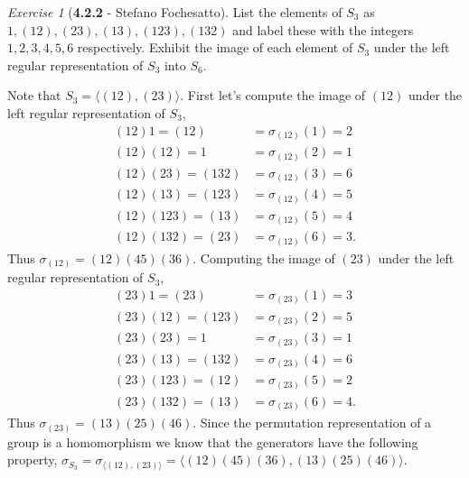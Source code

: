 \documentclass[12pt]{amsart}
\makeatletter
\theoremstyle{remark}
\newtheorem*{exercise}{Exercise}%
\renewenvironment{proof}[1][\proofname]{\par\doublespacing
  \pushQED{\qed}%
  \normalfont \topsep6\p@\@plus6\p@\relax
  \list{}{%
    \settowidth{\leftmargin}{\itshape\proofname:\hskip\labelsep}%
    \setlength{\labelwidth}{0pt}%
    \setlength{\itemindent}{-\leftmargin}%
  }%
  \item[\hskip\labelsep\itshape#1\@addpunct{:}]\ignorespaces
}{%
  \popQED\endlist\@endpefalse
  \singlespacing
}
\theoremstyle{mycomment}
\makeatother
\begin{document}
\begin{exercise}[\textbf{4.2.2} - Stefano Fochesatto] List the elements of $S_3$ as $1, (12), (23), (13), (123), (132)$ and label 
  these with the integers $1, 2, 3, 4, 5, 6$ respectively. Exhibit the image of each element of $S_3$ under the left 
  regular representation of $S_3$ into $S_6$. 
  \begin{proof}[Solution] Note that $S_3 = \langle(12), (23)\rangle$. First let's compute the image of $(12)$ under the 
    left regular representation of $S_3$, 
    \begin{align*}
      (12)1 = (12) &= \sigma_{(12)}(1) = 2\\
      (12)(12) = 1 &= \sigma_{(12)}(2) = 1\\
      (12)(23) = (132) &= \sigma_{(12)}(3) = 6\\
      (12)(13) = (123) &= \sigma_{(12)}(4) = 5\\
      (12)(123) = (13) &= \sigma_{(12)}(5) = 4\\
      (12)(132) = (23) &= \sigma_{(12)}(6) = 3.
    \end{align*} 
    Thus $\sigma_{(12)} = (12)(45)(36)$. Computing the image of $(23)$ under the left regular representation of $S_3$, 
    \begin{align*}
      (23)1 = (23) &= \sigma_{(23)}(1) = 3\\
      (23)(12) = (123) &= \sigma_{(23)}(2) = 5\\
      (23)(23) = 1 &= \sigma_{(23)}(3) = 1\\
      (23)(13) = (132) &= \sigma_{(23)}(4) = 6\\
      (23)(123) = (12) &= \sigma_{(23)}(5) = 2\\
      (23)(132) = (13) &= \sigma_{(23)}(6) = 4.
    \end{align*} 
    Thus $\sigma_{(23)} = (13)(25)(46)$. 
    Since the permutation representation of a group is a homomorphism we know that the generators have the following property, 
    $\sigma_{S_3} = \sigma_{\langle(12), (23)\rangle} = \langle (12)(45)(36), (13)(25)(46)\rangle$. 
  \end{proof}
\end{exercise}
\vspace{.15in}
\end{document}

